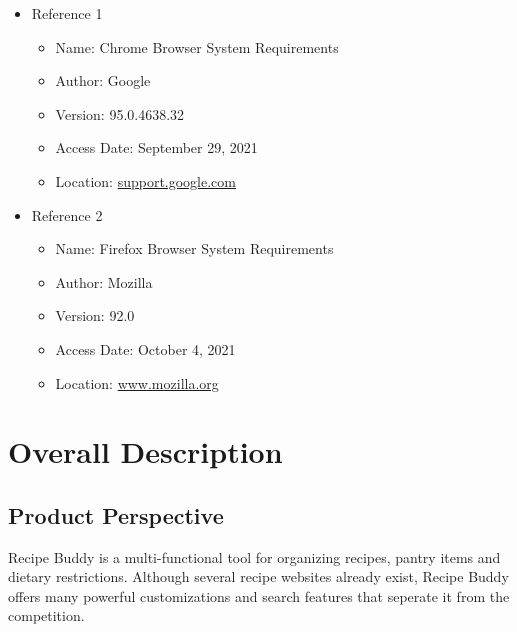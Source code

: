 \documentclass{scrreprt}
\begin{document}
\begin{itemize}
    \item Reference 1
    \begin{itemize}
        \item Name: Chrome Browser System Requirements
        \item Author: Google
        \item Version: 95.0.4638.32
        \item Access Date: September 29, 2021
        \item Location: \href{https://support.google.com/chrome/a/answer/7100626?hl=en}{support.google.com}
    \end{itemize}
    \item Reference 2
    \begin{itemize}
        \item Name: Firefox Browser System Requirements
        \item Author: Mozilla
        \item Version: 92.0
        \item Access Date: October 4, 2021
        \item Location: \href{https://www.mozilla.org/en-US/firefox/92.0.1/system-requirements/}{www.mozilla.org}
    \end{itemize}
\end{itemize}

\chapter{Overall Description}

\section{Product Perspective}
Recipe Buddy is a multi-functional tool for organizing recipes, pantry items and dietary restrictions.
Although several recipe websites already exist, Recipe Buddy offers many powerful customizations and search features that seperate it from the competition.
\end{document}
